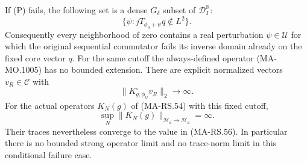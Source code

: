 If (P) fails, the following set is a dense
\(G_\delta\) subset of \(\mathscr D_I^\mathbb R\):
\[
 \{\psi:
          jT_{\phi_0+\psi}q\notin L^2\}.
\tag{MA-MO.1007}
\]
Consequently every neighborhood of zero contains a
real perturbation \(\psi\in\mathscr U\) for which
the original sequential commutator fails its inverse
domain already on the fixed core vector \(q\).
For the same cutoff the always-defined operator
(MA-MO.1005) has no bounded extension.  There are
explicit normalized vectors \(v_R\in\mathscr C\)
with
\[
       \|K^\circ_{g,\phi_\psi}v_R\|_2\longrightarrow\infty.
\tag{MA-MO.1008}
\]
For the actual operators \(K_N(g)\) of (MA-RS.54)
with this fixed cutoff,
\[
 \sup_N\|K_N(g)\|_{\mathcal H_a\to\mathcal H_a}=\infty .
\tag{MA-MO.1009}
\]
Their traces nevertheless converge to the value
in (MA-RS.56).  In particular there is no bounded
strong operator limit and no trace-norm limit in
this conditional failure case.

